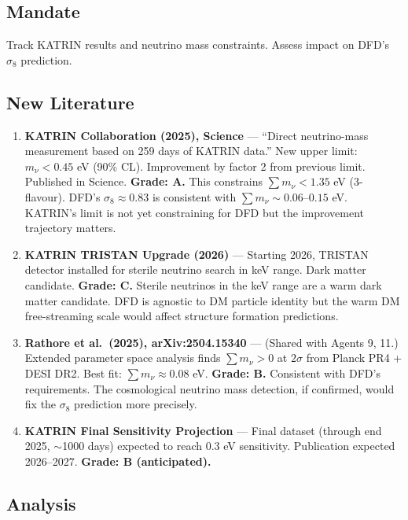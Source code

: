 \documentclass[11pt,a4paper]{article}
\begin{document}
\subsection{Mandate}
Track KATRIN results and neutrino mass constraints. Assess impact on DFD's $\sigma_8$ prediction.

\subsection{New Literature}

\begin{enumerate}

\item \textbf{KATRIN Collaboration (2025), Science} --- ``Direct neutrino-mass measurement based on 259 days of KATRIN data.'' New upper limit: $m_\nu < 0.45$ eV (90\% CL). Improvement by factor 2 from previous limit. Published in Science. \textbf{Grade: A.} This constrains $\sum m_\nu < 1.35$ eV (3-flavour). DFD's $\sigma_8 \approx 0.83$ is consistent with $\sum m_\nu \sim 0.06$--$0.15$ eV. KATRIN's limit is not yet constraining for DFD but the improvement trajectory matters.

\item \textbf{KATRIN TRISTAN Upgrade (2026)} --- Starting 2026, TRISTAN detector installed for sterile neutrino search in keV range. Dark matter candidate. \textbf{Grade: C.} Sterile neutrinos in the keV range are a warm dark matter candidate. DFD is agnostic to DM particle identity but the warm DM free-streaming scale would affect structure formation predictions.

\item \textbf{Rathore et al.\ (2025), arXiv:2504.15340} --- (Shared with Agents 9, 11.) Extended parameter space analysis finds $\sum m_\nu > 0$ at $2\sigma$ from Planck PR4 + DESI DR2. Best fit: $\sum m_\nu \approx 0.08$ eV. \textbf{Grade: B.} Consistent with DFD's requirements. The cosmological neutrino mass detection, if confirmed, would fix the $\sigma_8$ prediction more precisely.

\item \textbf{KATRIN Final Sensitivity Projection} --- Final dataset (through end 2025, $\sim$1000 days) expected to reach $0.3$ eV sensitivity. Publication expected 2026--2027. \textbf{Grade: B (anticipated).}

\end{enumerate}

\subsection{Analysis}
\end{document}
